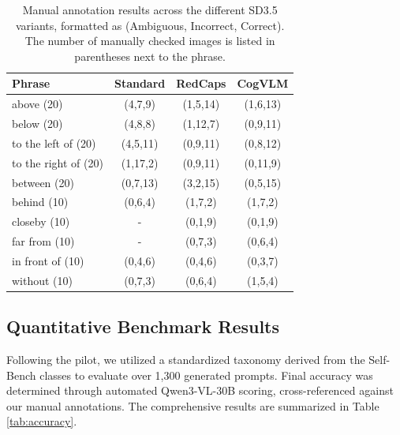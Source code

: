 \begin{table}[ht]
\caption{Manual annotation results across the different SD3.5 variants, formatted as (Ambiguous, Incorrect, Correct). The number of manually checked images is listed in parentheses next to the phrase.}
\label{tab:manual}
\begin{center}
\begin{small}
\begin{tabular}{lccc}
\toprule
\textbf{Phrase} & \textbf{Standard} & \textbf{RedCaps} & \textbf{CogVLM} \\
\midrule
above (20) & (4,7,9) & (1,5,14) & (1,6,13) \\
below (20) & (4,8,8) & (1,12,7) & (0,9,11) \\
to the left of (20) & (4,5,11) & (0,9,11) & (0,8,12) \\
to the right of (20) & (1,17,2) & (0,9,11) & (0,11,9) \\
between (20) & (0,7,13) & (3,2,15) & (0,5,15) \\
behind (10) & (0,6,4) & (1,7,2) & (1,7,2) \\
closeby (10) & - & (0,1,9) & (0,1,9) \\
far from (10) & - & (0,7,3) & (0,6,4) \\
in front of (10) & (0,4,6) & (0,4,6) & (0,3,7) \\
without (10) & (0,7,3) & (0,6,4) & (1,5,4) \\
\bottomrule
\end{tabular}
\end{small}
\end{center}
\end{table}

\subsection{Quantitative Benchmark Results}
Following the pilot, we utilized a standardized taxonomy derived from the Self-Bench classes to evaluate over 1,300 generated prompts. Final accuracy was determined through automated Qwen3-VL-30B scoring, cross-referenced against our manual annotations. The comprehensive results are summarized in Table \ref{tab:accuracy}.

